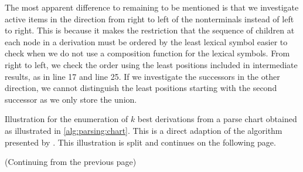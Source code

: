 \documentclass[../../document.tex]{subfiles}
\begin{document}
    The most apparent difference to  remaining to be mentioned is that we investigate active items in the direction from right to left of the  nonterminals instead of left to right.
    This is because it makes the restriction that the sequence of children at each node in a  derivation must be ordered by the least lexical symbol easier to check when we do not use a composition function for the lexical symbols.
    From right to left, we check the order using the least positions included in intermediate results, as in line 17 and line 25.
    If we investigate the successors in the other direction, we cannot distinguish the least positions starting with the second successor as we only store the union.

    \begin{algorithm}
        \caption{\label{alg:parsing:deriv}
            Illustration for the enumeration of $k$ best derivations from a parse chart obtained as illustrated in \cref{alg:parsing:chart}.
            This is a direct adaption of the algorithm presented by \citet{HuaChia05}.
            This illustration is split and continues on the following page.
        }
        
    \end{algorithm}

    \begin{algorithm}\ContinuedFloat
        \caption{
            (Continuing from the previous page)
        }
        
    \end{algorithm}
\end{document}
